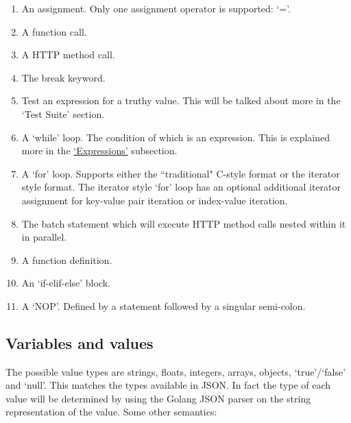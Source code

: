 \begin{center}
    \begin{enumerate}
        \item An assignment. Only one assignment operator is supported: `='.
        \item A function call.
        \item A HTTP method call.
        \item The break keyword.
        \item Test an expression for a truthy value. This will be talked about more in the `Test Suite' section.
        \item A `while' loop. The condition of which is an expression. This is explained more in the \hyperref[sec:expressions]{`Expressions'} subsection.
        \item A `for' loop. Supports either the ``traditional" C-style format or the iterator style format. The iterator style `for' loop has an optional additional iterator assignment for key-value pair iteration or index-value iteration.
        \item The batch statement which will execute HTTP method calls nested within it in parallel.
        \item A function definition.
        \item An `if-elif-else' block.
        \item A `NOP'. Defined by a statement followed by a singular semi-colon.
    \end{enumerate}
\end{center}

\subsection{Variables and values}

The possible value types are strings, floats, integers, arrays, objects, `true'/`false' and `null'. This matches the types available in JSON. In fact the type of each value will be determined by using the Golang JSON parser on the string representation of the value. Some other semantics:

